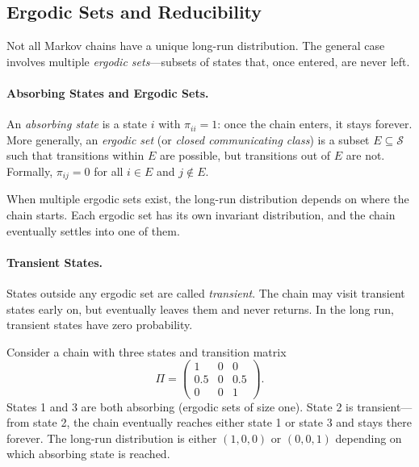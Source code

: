 \subsection{Ergodic Sets and Reducibility}
\label{subsec:ergodic-sets}

Not all Markov chains have a unique long-run distribution. The general case involves multiple \emph{ergodic sets}---subsets of states that, once entered, are never left.

\paragraph{Absorbing States and Ergodic Sets.}
An \emph{absorbing state} is a state $i$ with $\pi_{ii} = 1$: once the chain enters, it stays forever. More generally, an \emph{ergodic set} (or \emph{closed communicating class}) is a subset $E \subseteq \mathcal{S}$ such that transitions within $E$ are possible, but transitions out of $E$ are not. Formally, $\pi_{ij} = 0$ for all $i \in E$ and $j \notin E$.

When multiple ergodic sets exist, the long-run distribution depends on where the chain starts. Each ergodic set has its own invariant distribution, and the chain eventually settles into one of them.

\paragraph{Transient States.}
States outside any ergodic set are called \emph{transient}. The chain may visit transient states early on, but eventually leaves them and never returns. In the long run, transient states have zero probability.

\begin{calloutnote}
Consider a chain with three states and transition matrix
\begin{equation*}
\Pi = \begin{pmatrix}
1 & 0 & 0 \\
0.5 & 0 & 0.5 \\
0 & 0 & 1
\end{pmatrix}.
\end{equation*}
States 1 and 3 are both absorbing (ergodic sets of size one). State 2 is transient---from state 2, the chain eventually reaches either state 1 or state 3 and stays there forever. The long-run distribution is either $(1, 0, 0)$ or $(0, 0, 1)$ depending on which absorbing state is reached.
\end{calloutnote}


